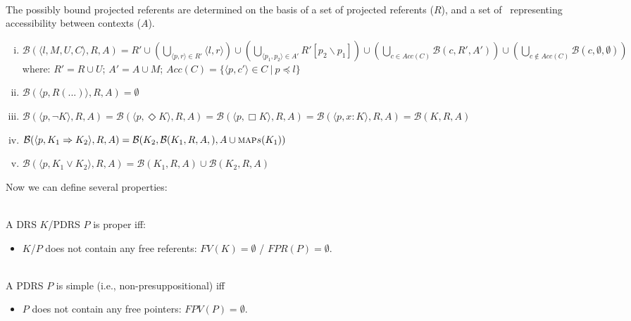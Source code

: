 \begin{subdefinition}~\\
  The possibly bound projected referents are determined on the basis of a
  set of projected referents ($R$), and a set of \MAPs~representing
  accessibility between contexts ($A$).
  \begin{enumerate}[i.]
    \item $\mathcal{B}(\langle l, M, U, C \rangle,R,A) 
      = R' \cup (\bigcup_{\langle p, r\rangle\in R'} \langle l, r\rangle)
      \cup (\bigcup_{\langle p_1,p_2\rangle\in A'} R'[p_2\backslash p_1])
      \cup (\bigcup_{c\in Acc(C)} \mathcal{B}(c,R',A'))
      \cup (\bigcup_{c\notin Acc(C)} \mathcal{B}(c,\emptyset,\emptyset))$\\
      where: $R' = R \cup U$;
             $A' = A \cup M$;
             $Acc(C) = \{\langle p, c'\rangle \in C~|~ p \preceq l\}$
    \item $\mathcal{B}(\langle p, R(...)\rangle,R,A) = \emptyset$
    \item $\mathcal{B}(\langle p,\neg K\rangle,R,A)
      = \mathcal{B}(\langle p,\Diamond K\rangle,R,A)
      = \mathcal{B}(\langle p,\Box K\rangle,R,A)
      = \mathcal{B}(\langle p,x:K\rangle,R,A)
      = \mathcal{B}(K,R,A)$
    \item $\mathcal{B}(\langle p,K_1 \Rightarrow K_2\rangle,R,A)
      = \mathcal{B}(K_2,\mathcal{B}(K_1,R,A,),A\cup \textsc{map}s(K_1))$
    \item $\mathcal{B}(\langle p,K_1 \vee K_2\rangle,R,A)
      = \mathcal{B}(K_1,R,A) \cup \mathcal{B}(K_2,R,A)$
      \end{enumerate}
\end{subdefinition}


Now we can define several properties:

\begin{definition}[Properness]~\\
A DRS $K$/PDRS $P$ is proper iff:
\begin{itemize}
  \item $K$/$P$ does not contain any free referents: $FV(K) = \emptyset$ / $FPR(P) = \emptyset$.
\end{itemize}
\end{definition}


\begin{definition}[Simpleness]~\\
A PDRS $P$ is simple (i.e., non-presuppositional) iff
\begin{itemize}
  \item $P$ does not contain any free pointers: $FPV(P) = \emptyset$.
\end{itemize}
\end{definition}


